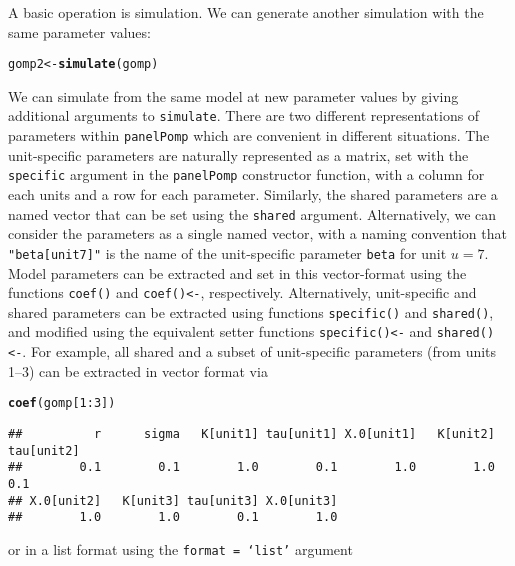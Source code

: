 \documentclass[12pt]{article}\usepackage[]{graphicx}\usepackage[table]{xcolor}
\makeatletter
\newcommand{\hlnum}[1]{\textcolor[rgb]{0.686,0.059,0.569}{#1}}%
\newcommand{\hlopt}[1]{\textcolor[rgb]{0,0,0}{#1}}%
\newcommand{\hldef}[1]{\textcolor[rgb]{0.345,0.345,0.345}{#1}}%
\newcommand{\hlkwb}[1]{\textcolor[rgb]{0.69,0.353,0.396}{#1}}%
\newcommand{\hlkwd}[1]{\textcolor[rgb]{0.737,0.353,0.396}{\textbf{#1}}}%
\newenvironment{kframe}{%
 \def\at@end@of@kframe{}%
 \ifinner\ifhmode%
  \def\at@end@of@kframe{\end{minipage}}%
  \begin{minipage}{\columnwidth}%
 \fi\fi%
 \def\FrameCommand##1{\hskip\@totalleftmargin \hskip-\fboxsep
 \colorbox{shadecolor}{##1}\hskip-\fboxsep
     \hskip-\linewidth \hskip-\@totalleftmargin \hskip\columnwidth}%
 \MakeFramed {\advance\hsize-\width
   \@totalleftmargin\z@ \linewidth\hsize
   \@setminipage}}%
 {\par\unskip\endMakeFramed%
 \at@end@of@kframe}
\newenvironment{knitrout}{}{} %
\newcommand\code{\texttt}
\newcommand\panelPomp{\texttt{panelPomp}\xspace}
\makeatother
\begin{document}
A basic operation is simulation.
We can generate another simulation with the same parameter values:
\begin{knitrout}
\color{fgcolor}\begin{kframe}
\begin{alltt}
\hldef{gomp2} \hlkwb{<-} \hlkwd{simulate}\hldef{(gomp)}
\end{alltt}
\end{kframe}
\end{knitrout}
\noindent We can simulate from the same model at new parameter values by giving additional arguments to \code{simulate}.
There are two different representations of parameters within \panelPomp which are convenient in different situations.
The unit-specific parameters are naturally represented as a matrix, set with the \code{specific} argument in the \code{panelPomp} constructor function, with a column for each units and a row for each parameter.
Similarly, the shared parameters are a named vector that can be set using the \code{shared} argument.
Alternatively, we can consider the parameters as a single named vector, with a naming convention that \code{"beta[unit7]"} is the name of the unit-specific parameter \code{beta} for unit $u=7$.
Model parameters can be extracted and set in this vector-format using the functions \code{coef()} and \code{coef()<-}, respectively.
Alternatively, unit-specific and shared parameters can be extracted using functions \code{specific()} and \code{shared()}, and modified using the equivalent setter functions \code{specific()<-} and \code{shared()<-}.
For example, all shared and a subset of unit-specific parameters (from units 1--3) can be extracted in vector format via
\begin{knitrout}
\color{fgcolor}\begin{kframe}
\begin{alltt}
\hlkwd{coef}\hldef{(gomp[}\hlnum{1}\hlopt{:}\hlnum{3}\hldef{])}
\end{alltt}
\begin{verbatim}
##          r      sigma   K[unit1] tau[unit1] X.0[unit1]   K[unit2] tau[unit2] 
##        0.1        0.1        1.0        0.1        1.0        1.0        0.1 
## X.0[unit2]   K[unit3] tau[unit3] X.0[unit3] 
##        1.0        1.0        0.1        1.0
\end{verbatim}
\end{kframe}
\end{knitrout}
\noindent or in a list format using the \code{format = `list'} argument
\end{document}
